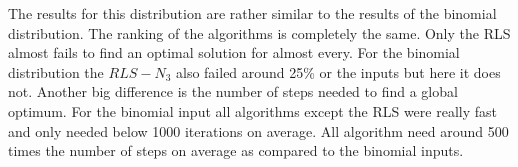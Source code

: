 The results for this distribution are rather similar to the results of the binomial distribution.
The ranking of the algorithms is completely the same.
Only the RLS almost fails to find an optimal solution for almost every.
For the binomial distribution the $RLS-N_3$ also failed around 25\% or the inputs but here it does not.
Another big difference is the number of steps needed to find a global optimum.
For the binomial input all algorithms except the RLS were really fast and only needed below 1000 iterations on average.
All algorithm need around 500 times the number of steps on average as compared to the binomial inputs.